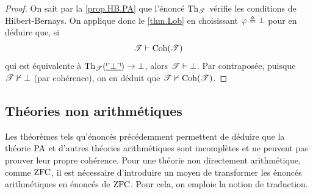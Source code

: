 \begin{proof}
  On sait par la \cref{prop.HB.PA} que l'énoncé $\operatorname{Th}_{\mathscr T}$ vérifie les
  conditions de Hilbert-Bernays. On applique donc le \cref{thm.Lob} en
  choisissant $\varphi \triangleq \bot$ pour en déduire que, si
  \[\mathscr T \vdash \operatorname{Coh}(\mathscr T)\]
  qui est équivalente à $\operatorname{Th}_{\mathscr T}(\underline{\ulcorner\bot\urcorner}) \to \bot$,
  alors $\mathscr T \vdash \bot$. Par contraposée, puisque $\mathscr T \nvdash \bot$
  (par cohérence), on en déduit que $\mathscr T \nvdash \operatorname{Coh}(\mathscr T)$.
\end{proof}

\subsection{Théories non arithmétiques}

Les théorèmes tels qu'énoncés précédemment permettent de déduire que
la théorie $\operatorname{PA}$ et d'autres théories arithmétiques sont incomplètes
et ne peuvent pas prouver leur propre cohérence. Pour une théorie non
directement arithmétique, comme $\operatorname{ZFC}$, il est nécessaire d'introduire un moyen
de transformer les énoncés arithmétiques en énoncés de $\operatorname{ZFC}$. Pour cela, on
emploie la notion de traduction.


